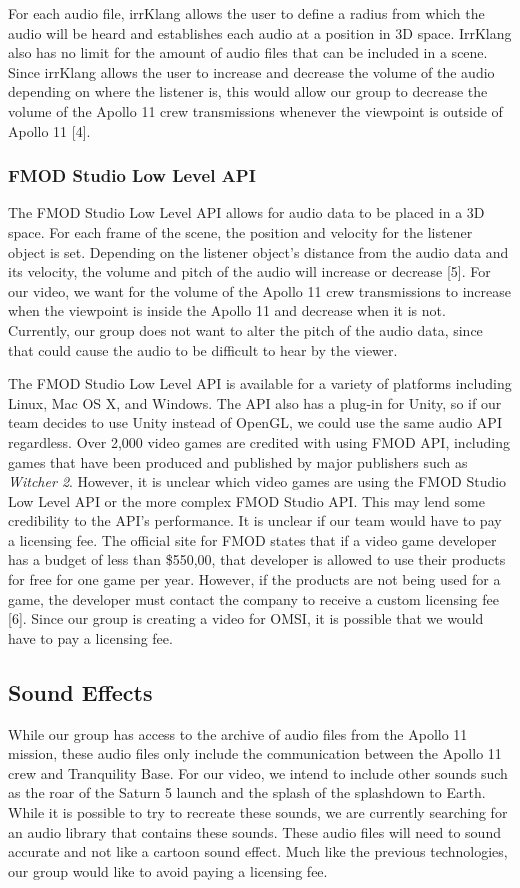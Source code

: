\documentclass[onecolumn, draftclsnofoot,10pt, compsoc]{IEEEtran}
\begin{document}
For each audio file, irrKlang allows the user to define a radius from which the audio will be heard and establishes each audio at a position in 3D space. IrrKlang also has no limit for the amount of audio files that can be included in a scene. Since irrKlang allows the user to increase and decrease the volume of the audio depending on where the listener is, this would allow our group to decrease the volume of the Apollo 11 crew transmissions whenever the viewpoint is outside of Apollo 11 [4]. 

\subsubsection{FMOD Studio Low Level API}
The FMOD Studio Low Level API allows for audio data to be placed in a 3D space. For each frame of the scene, the position and velocity for the listener object is set. Depending on the listener object's distance from the audio data and its velocity, the volume and pitch of the audio will increase or decrease [5]. For our video, we want for the volume of the Apollo 11 crew transmissions to increase when the viewpoint is inside the Apollo 11 and decrease when it is not. Currently, our group does not want to alter the pitch of the audio data, since that could cause the audio to be difficult to hear by the viewer.

The FMOD Studio Low Level API is available for a variety of platforms including Linux, Mac OS X, and Windows. The API also has a plug-in for Unity, so if our team decides to use Unity instead of OpenGL, we could use the same audio API regardless. Over 2,000 video games are credited with using FMOD API, including games that have been produced and published by major publishers such as \textit{Witcher 2}. However, it is unclear which video games are using the FMOD Studio Low Level API or the more complex FMOD Studio API. This may lend some credibility to the API's performance. It is unclear if our team would have to pay a licensing fee. The official site for FMOD states that if a video game developer has a budget of less than \$550,00, that developer is allowed to use their products for free for one game per year. However, if the products are not being used for a game, the developer must contact the company to receive a custom licensing fee [6]. Since our group is creating a video for OMSI, it is possible that we would have to pay a licensing fee.

\subsection{Sound Effects}
While our group has access to the archive of audio files from the Apollo 11 mission, these audio files only include the communication between the Apollo 11 crew and Tranquility Base. For our video, we intend to include other sounds such as the roar of the Saturn 5 launch and the splash of the splashdown to Earth. While it is possible to try to recreate these sounds, we are currently searching for an audio library that contains these sounds. These audio files will need to sound accurate and not like a cartoon sound effect. Much like the previous technologies, our group would like to avoid paying a licensing fee.
\end{document}
